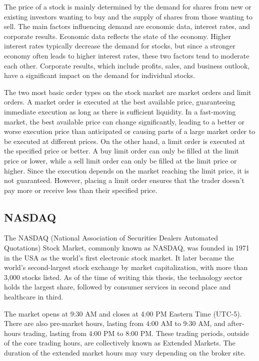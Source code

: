 \documentclass[a4paper,oneside,onecolumn,12pt]{book}
\begin{document}
The price of a stock is mainly determined by the demand for shares from new or existing investors wanting to buy and the supply of shares from those wanting to sell. The main factors influencing demand are economic data, interest rates, and corporate results. Economic data reflects the state of the economy. Higher interest rates typically decrease the demand for stocks, but since a stronger economy often leads to higher interest rates, these two factors tend to moderate each other. Corporate results, which include profits, sales, and business outlook, have a significant impact on the demand for individual stocks. \cite{HDLSandDASM}

The two most basic order types on the stock market are market orders and limit orders. A market order is executed at the best available price, guaranteeing immediate execution as long as there is sufficient liquidity. In a fast-moving market, the best available price can change significantly, leading to a better or worse execution price than anticipated or causing parts of a large market order to be executed at different prices. On the other hand, a limit order is executed at the specified price or better. A buy limit order can only be filled at the limit price or lower, while a sell limit order can only be filled at the limit price or higher. Since the execution depends on the market reaching the limit price, it is not guaranteed. However, placing a limit order ensures that the trader doesn't pay more or receive less than their specified price.\cite{TBUDWBSS}

	\subsection{NASDAQ}
	The NASDAQ (National Association of Securities Dealers Automated Quotations) Stock Market, commonly known as NASDAQ, was founded in 1971 in the USA as the world's first electronic stock market. It later became the world's second-largest stock exchange by market capitalization, with more than 3,000 stocks listed. As of the time of writing this thesis, the technology sector holds the largest share, followed by consumer services in second place and healthcare in third. \cite{WNCandWCI}

	The market opens at 9:30 AM and closes at 4:00 PM Eastern Time (UTC-5). There are also pre-market hours, lasting from 4:00 AM to 9:30 AM, and after-hours trading, lasting from 4:00 PM to 8:00 PM. These trading periods, outside of the core trading hours, are collectively known as Extended Markets. The duration of the extended market hours may vary depending on the broker site. \cite{SMHandTH}
	
\end{document}
